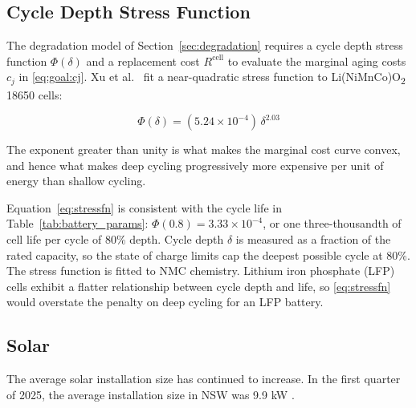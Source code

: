 \subsection{Cycle Depth Stress Function}
\label{sec:stressfn}
The degradation model of Section~\ref{sec:degradation} requires a cycle depth stress function $\Phi(\delta)$ and a replacement cost $R^{\text{cell}}$ to evaluate the marginal aging costs $c_j$ in \eqref{eq:goal:cj}. Xu et al.\ \cite{Xu2018} fit a near-quadratic stress function to Li(NiMnCo)O\textsubscript{2} 18650 cells:

\begin{equation}
    \label{eq:stressfn}
    \Phi(\delta) = (5.24\times10^{-4})\,\delta^{2.03}
\end{equation}

The exponent greater than unity is what makes the marginal cost curve convex, and hence what makes deep cycling progressively more expensive per unit of energy than shallow cycling.

Equation~\eqref{eq:stressfn} is consistent with the cycle life in Table~\ref{tab:battery_params}: $\Phi(0.8) = 3.33\times10^{-4}$, or one three-thousandth of cell life per cycle of 80\% depth. Cycle depth $\delta$ is measured as a fraction of the rated capacity, so the state of charge limits cap the deepest possible cycle at 80\%. The stress function is fitted to NMC chemistry. Lithium iron phosphate (LFP) cells exhibit a flatter relationship between cycle depth and life, so \eqref{eq:stressfn} would overstate the penalty on deep cycling for an LFP battery.

\subsection{Solar}
The average solar installation size has continued to increase. In the first quarter of 2025, the average installation size in NSW was 9.9 kW \cite{AEC2025Solar}.
